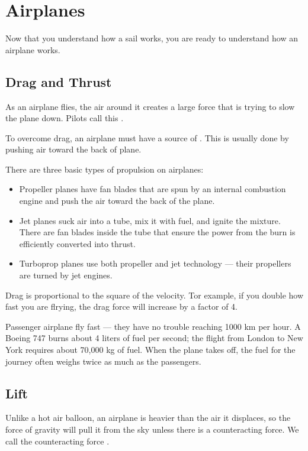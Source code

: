 \chapter{Airplanes}

Now that you understand how a sail works,  you are ready to understand how an airplane works.   

\section{Drag and Thrust}

As an airplane flies, the air around it creates a large force that is trying to slow the 
plane down.  Pilots call this .


To overcome drag, an airplane must have a source of .  This is usually done by pushing air toward the back of plane.

There are three basic types of propulsion on airplanes:

\begin{itemize}
\item Propeller planes have fan blades that are spun by an internal combustion engine and push the air toward the back of the plane.  
\item Jet planes suck air into a tube,  mix it with fuel,  and ignite the mixture.  There are fan blades inside the tube that ensure
the power from the burn is efficiently converted into thrust.
\item Turboprop planes use both propeller and jet technology --- their propellers are turned by jet engines.
\end{itemize}

Drag is proportional to the square of the velocity. Tor example, if you double how fast you are flrying, the drag force will increase by a factor of 4. 

Passenger airplane fly fast --- they have no trouble reaching 1000 km per hour. A Boeing 747 burns about 4 liters of fuel per second; the flight from London to New York requires about 70,000 kg of fuel.  When the plane takes off,  the fuel for the journey often weighs twice as much as the passengers.
 
\section{Lift}

Unlike a hot air balloon, an airplane is heavier than the 
air it displaces, so the force of gravity will pull it from the sky unless there is a counteracting force.  We call the counteracting force .

